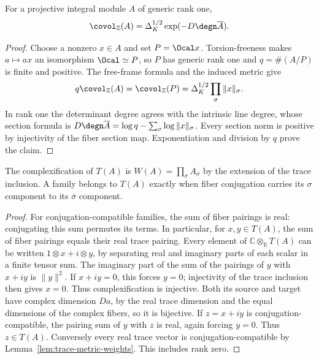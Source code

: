 \begin{lemma}
\label{lem:trace-covolume-line}
\leanok
For a projective integral module $A$ of generic rank one,
\[
 \covol_{\mathbb Z}(A)=\Delta_K^{1/2}\exp(-D\degn\overline A).
\]
\end{lemma}
\begin{proof}
Choose a nonzero $x\in A$ and set $P=\Ocal x$. Torsion-freeness makes
$a\mapsto ax$ an isomorphism $\Ocal\simeq P$, so $P$ has generic rank
one and $q=\#(A/P)$ is finite and positive. The free-frame formula and
the induced metric give
\[
 q\covol_{\mathbb Z}(A)=\covol_{\mathbb Z}(P)
 =\Delta_K^{1/2}\prod_\sigma\|x\|_\sigma.
\]
In rank one the determinant degree agrees with the intrinsic line degree,
whose section formula is
$D\degn\overline A=\log q-\sum_\sigma\log\|x\|_\sigma$.
Every section norm is positive by injectivity of the fiber section map.
Exponentiation and division by $q$ prove the claim.
\end{proof}

\begin{lemma}
\label{lem:trace-real-form}
\leanok
The complexification of $T(A)$ is $W(A)=\prod_\sigma A_\sigma$ by the
extension of the trace inclusion. A family belongs to $T(A)$ exactly when
fiber conjugation carries its $\sigma$ component to its
$\overline\sigma$ component.
\end{lemma}
\begin{proof}
For conjugation-compatible families, the sum of fiber pairings is real:
conjugating this sum permutes its terms. In particular, for $x,y\in T(A)$,
the sum of fiber pairings equals their real trace pairing.
Every element of $\mathbb C\otimes_{\mathbb R}T(A)$ can be written
$1\otimes x+i\otimes y$, by separating real and imaginary parts of each
scalar in a finite tensor sum. The imaginary part of the sum of the
pairings of $y$ with $x+iy$ is $\|y\|^2$. If $x+iy=0$, this forces $y=0$;
injectivity of the trace inclusion then gives $x=0$. Thus complexification
is injective. Both its source and target have complex dimension $Da$, by
the real trace dimension and the equal dimensions of the complex fibers,
so it is bijective. If $z=x+iy$ is conjugation-compatible, the pairing
sum of $y$ with $z$ is real, again forcing $y=0$. Thus $z\in T(A)$.
Conversely every real trace vector is conjugation-compatible by
Lemma~\ref{lem:trace-metric-weights}. This includes rank zero.
\end{proof}


